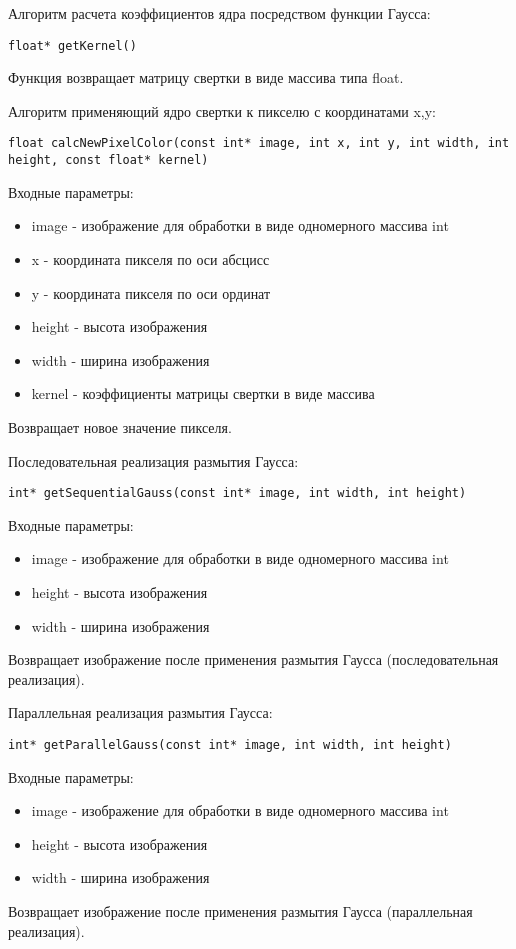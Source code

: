\documentclass{report}
\begin{document}
Алгоритм расчета коэффициентов ядра посредством функции Гаусса:
\begin{lstlisting}
float* getKernel()
\end{lstlisting}
Функция возвращает матрицу свертки в виде массива типа float.

Алгоритм применяющий ядро свертки к пикселю с координатами x,y:
\begin{lstlisting}
float calcNewPixelColor(const int* image, int x, int y, int width, int height, const float* kernel)
\end{lstlisting}
Входные параметры:
\begin{itemize}
\item image - изображение для обработки в виде одномерного массива int
\item x - координата пикселя по оси абсцисс
\item y - координата пикселя по оси ординат
\item height - высота изображения
\item width - ширина изображения
\item kernel - коэффициенты матрицы свертки в виде массива
\end{itemize}
Возвращает новое значение пикселя.

Последовательная реализация размытия Гаусса:
\begin{lstlisting}
int* getSequentialGauss(const int* image, int width, int height)
\end{lstlisting}
Входные параметры:
\begin{itemize}
\item image - изображение для обработки в виде одномерного массива int
\item height - высота изображения
\item width - ширина изображения
\end{itemize}
Возвращает изображение после применения размытия Гаусса (последовательная реализация).

Параллельная реализация размытия Гаусса:
\begin{lstlisting}
int* getParallelGauss(const int* image, int width, int height)
\end{lstlisting}
Входные параметры:
\begin{itemize}
\item image - изображение для обработки в виде одномерного массива int
\item height - высота изображения
\item width - ширина изображения
\end{itemize}
Возвращает изображение после применения размытия Гаусса (параллельная реализация).
\newpage
\end{document}
